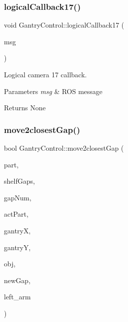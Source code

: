 \subsubsection{\texorpdfstring{logical\+Callback17()}{logicalCallback17()}}
{\footnotesize\ttfamily void Gantry\+Control\+::logical\+Callback17 (\begin{DoxyParamCaption}\item[{const nist\+\_\+gear\+::\+Logical\+Camera\+Image \&}]{msg }\end{DoxyParamCaption})}



Logical camera 17 callback. 


\begin{DoxyParams}{Parameters}
{\em msg} & R\+OS message \\
\hline
\end{DoxyParams}
\begin{DoxyReturn}{Returns}
None 
\end{DoxyReturn}
\mbox{\label{classGantryControl_a9832fe95565f2b6663426b5568ab0a03}} 
\subsubsection{\texorpdfstring{move2closest\+Gap()}{move2closestGap()}}
{\footnotesize\ttfamily bool Gantry\+Control\+::move2closest\+Gap (\begin{DoxyParamCaption}\item[{struct \hyperlink{structPart}{Part} \&}]{part,  }\item[{std\+::vector$<$ std\+::pair$<$ float, float $>$ $>$ \&}]{shelf\+Gaps,  }\item[{const std\+::vector$<$ int $>$ \&}]{gap\+Num,  }\item[{int}]{act\+Part,  }\item[{float \&}]{gantryX,  }\item[{float \&}]{gantryY,  }\item[{\hyperlink{classObstaclesInAisle}{Obstacles\+In\+Aisle} \&}]{obj,  }\item[{int \&}]{new\+Gap,  }\item[{std\+::vector$<$ double $>$ \&}]{left\+\_\+arm }\end{DoxyParamCaption})}



